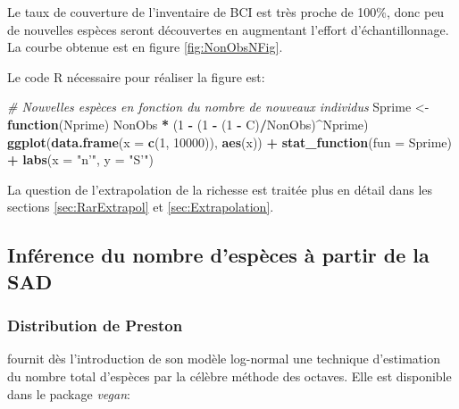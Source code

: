\documentclass[
  11pt,
  french,
  a4paper,
  extrafontsizes,onecolumn,openright
  ]{memoir}
\newenvironment{Shaded}{\begin{snugshade}}{\end{snugshade}}
\newcommand{\CommentTok}[1]{\textcolor[rgb]{0.56,0.35,0.01}{\textit{#1}}}
\newcommand{\ControlFlowTok}[1]{\textcolor[rgb]{0.13,0.29,0.53}{\textbf{#1}}}
\newcommand{\DataTypeTok}[1]{\textcolor[rgb]{0.13,0.29,0.53}{#1}}
\newcommand{\DecValTok}[1]{\textcolor[rgb]{0.00,0.00,0.81}{#1}}
\newcommand{\KeywordTok}[1]{\textcolor[rgb]{0.13,0.29,0.53}{\textbf{#1}}}
\newcommand{\NormalTok}[1]{#1}
\newcommand{\OperatorTok}[1]{\textcolor[rgb]{0.81,0.36,0.00}{\textbf{#1}}}
\newcommand{\StringTok}[1]{\textcolor[rgb]{0.31,0.60,0.02}{#1}}
\begin{document}
\normalsize

Le taux de couverture de l'inventaire de BCI est très proche de 100\%, donc peu de nouvelles espèces seront découvertes en augmentant l'effort d'échantillonnage.
La courbe obtenue est en figure \ref{fig:NonObsNFig}.

Le code R nécessaire pour réaliser la figure est:

\scriptsize

\begin{Shaded}
\begin{Highlighting}[]
\CommentTok{# Nouvelles espèces en fonction du nombre de nouveaux individus}
\NormalTok{Sprime <-}\StringTok{ }\ControlFlowTok{function}\NormalTok{(Nprime) NonObs }\OperatorTok{*}\StringTok{ }\NormalTok{(}\DecValTok{1} \OperatorTok{-}\StringTok{ }\NormalTok{(}\DecValTok{1} \OperatorTok{-}\StringTok{ }\NormalTok{(}\DecValTok{1} \OperatorTok{-}\StringTok{ }\NormalTok{C)}\OperatorTok{/}\NormalTok{NonObs)}\OperatorTok{^}\NormalTok{Nprime)}
\KeywordTok{ggplot}\NormalTok{(}\KeywordTok{data.frame}\NormalTok{(}\DataTypeTok{x =} \KeywordTok{c}\NormalTok{(}\DecValTok{1}\NormalTok{, }\DecValTok{10000}\NormalTok{)), }\KeywordTok{aes}\NormalTok{(x)) }\OperatorTok{+}\StringTok{ }
\StringTok{  }\KeywordTok{stat_function}\NormalTok{(}\DataTypeTok{fun =}\NormalTok{ Sprime) }\OperatorTok{+}
\StringTok{  }\KeywordTok{labs}\NormalTok{(}\DataTypeTok{x =} \StringTok{"n'"}\NormalTok{, }\DataTypeTok{y =} \StringTok{"S'"}\NormalTok{)}
\end{Highlighting}
\end{Shaded}

\normalsize

La question de l'extrapolation de la richesse est traitée plus en détail dans les sections \ref{sec:RarExtrapol} et \ref{sec:Extrapolation}.

\hypertarget{infuxe9rence-du-nombre-despuxe8ces-uxe0-partir-de-la-sad}{%
\subsection{Inférence du nombre d'espèces à partir de la SAD}\label{infuxe9rence-du-nombre-despuxe8ces-uxe0-partir-de-la-sad}}

\hypertarget{distribution-de-preston}{%
\subsubsection{Distribution de Preston}\label{distribution-de-preston}}

\textcite{Preston1948} fournit dès l'introduction de son modèle log-normal une technique d'estimation du nombre total d'espèces par la célèbre méthode des octaves.
Elle est disponible dans le package \emph{vegan}:
\end{document}

